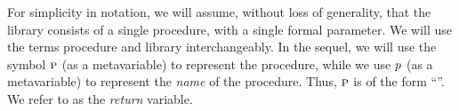 For simplicity in notation, we will assume, without loss of generality,
that the library consists of a single procedure, with a single formal
parameter. We will use the terms procedure and library interchangeably.
In the sequel, we will use the symbol $\textsc{p}$ (as a metavariable) to represent the procedure,
while we use $p$ (as a metavariable) to represent the \emph{name} of the procedure.
Thus, $\textsc{p}$ is of the form ``''. We refer to  as the \emph{return}
variable.
